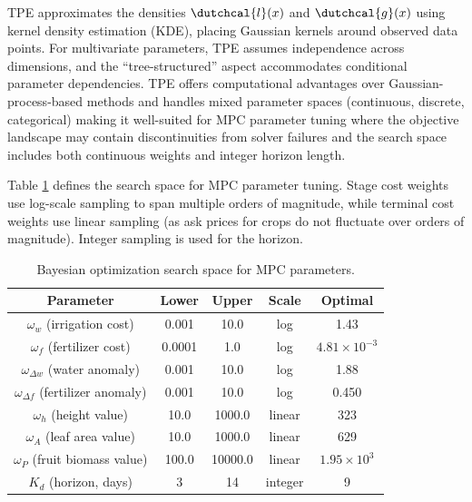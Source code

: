 \documentclass[pdflatex,sn-mathphys-num]{sn-jnl}
\begin{document}
TPE approximates the densities $\dutchcal{l}(x)$ and $\dutchcal{g}(x)$ using kernel density estimation (KDE), placing Gaussian kernels around observed data points. For multivariate parameters, TPE assumes independence across dimensions, and the ``tree-structured'' aspect accommodates conditional parameter dependencies. TPE offers computational advantages over Gaussian-process-based methods and handles mixed parameter spaces (continuous, discrete, categorical) making it well-suited for MPC parameter tuning where the objective landscape may contain discontinuities from solver failures and the search space includes both continuous weights and integer horizon length.

Table \ref{tab:search-space} defines the search space for MPC parameter tuning. Stage cost weights use log-scale sampling to span multiple orders of magnitude, while terminal cost weights use linear sampling (as ask prices for crops do not fluctuate over orders of magnitude). Integer sampling is used for the horizon.

\begin{table}[ht]
\centering
\begin{tabular}{|c|c|c|c|c|}
\hline
Parameter & Lower & Upper & Scale  & Optimal \\
\hline\hline
$\omega_w$          (irrigation cost)     & 0.001  & 10.0    & log     & 1.43                  \\
$\omega_f$          (fertilizer cost)     & 0.0001 & 1.0     & log     & $4.81 \times 10^{-3}$ \\
$\omega_{\Delta w}$ (water anomaly)       & 0.001  & 10.0    & log     & 1.88                  \\
$\omega_{\Delta f}$ (fertilizer anomaly)  & 0.001  & 10.0    & log     & 0.450                 \\
$\omega_h$          (height value)        & 10.0   & 1000.0  & linear  & 323                   \\
$\omega_A$          (leaf area value)     & 10.0   & 1000.0  & linear  & 629                   \\
$\omega_P$          (fruit biomass value) & 100.0  & 10000.0 & linear  & $1.95 \times 10^{3}$  \\
$K_{d}$             (horizon, days)       & 3      & 14      & integer & 9                     \\
\hline
\end{tabular}
\caption{Bayesian optimization search space for MPC parameters.}
\label{tab:search-space}
\end{table}
\end{document}
